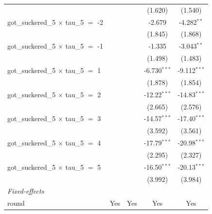 \begin{tabular}{lcccc}
                                                 &                &                 & (1.620)        & (1.540)\\   
   got\_suckered\_5 $\times$ tau\_5 $=$ -2       &                &                 & -2.679         & -4.282$^{**}$\\   
                                                 &                &                 & (1.845)        & (1.868)\\   
   got\_suckered\_5 $\times$ tau\_5 $=$ -1       &                &                 & -1.335         & -3.043$^{**}$\\   
                                                 &                &                 & (1.498)        & (1.483)\\   
   got\_suckered\_5 $\times$ tau\_5 $=$ 1        &                &                 & -6.730$^{***}$ & -9.112$^{***}$\\   
                                                 &                &                 & (1.878)        & (1.854)\\   
   got\_suckered\_5 $\times$ tau\_5 $=$ 2        &                &                 & -12.22$^{***}$ & -14.83$^{***}$\\   
                                                 &                &                 & (2.665)        & (2.576)\\   
   got\_suckered\_5 $\times$ tau\_5 $=$ 3        &                &                 & -14.57$^{***}$ & -17.40$^{***}$\\   
                                                 &                &                 & (3.592)        & (3.561)\\   
   got\_suckered\_5 $\times$ tau\_5 $=$ 4        &                &                 & -17.79$^{***}$ & -20.98$^{***}$\\   
                                                 &                &                 & (2.295)        & (2.327)\\   
   got\_suckered\_5 $\times$ tau\_5 $=$ 5        &                &                 & -16.50$^{***}$ & -20.13$^{***}$\\   
                                                 &                &                 & (3.992)        & (3.984)\\   
   \midrule
   \emph{Fixed-effects}\\
   round                                         & Yes            & Yes             & Yes            & Yes\\  

\end{tabular}
